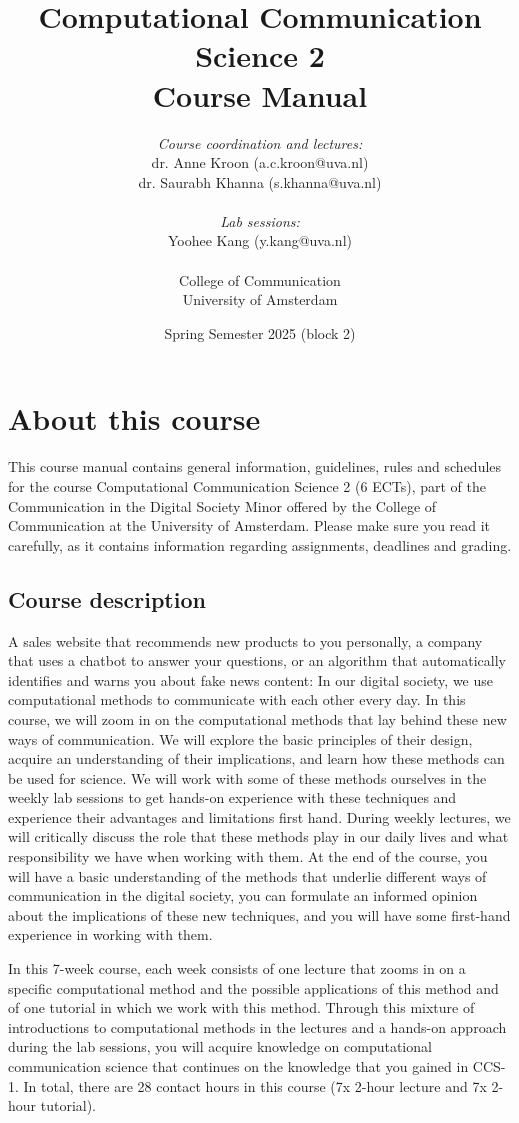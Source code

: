 \documentclass[a4paper,10pt]{report}
\title{Computational Communication Science 2\\ Course Manual}
\author{\emph{Course coordination and lectures:}\\ dr. Anne Kroon (a.c.kroon@uva.nl)\\dr. Saurabh Khanna (s.khanna@uva.nl) \\ \\ \emph{Lab sessions:} \\Yoohee Kang (y.kang@uva.nl) \\~\\College of Communication\\University of Amsterdam}
\date{Spring Semester 2025 (block 2)}
\begin{document}
	\maketitle
	
	\tableofcontents

	
	\chapter{About this course}
	
	This course manual contains general information, guidelines, rules and schedules for the course Computational Communication Science 2 (6 ECTs), part of the Communication in the Digital Society Minor offered by the College of Communication at the University of Amsterdam. Please make sure you read it carefully, as it  contains information regarding assignments, deadlines and grading.
	
	\section{Course description}
	
	A sales website that recommends new products to you personally, a company that uses a chatbot to answer your questions, or an algorithm that automatically identifies and warns you about fake news content: In our digital society, we use computational methods to communicate with each other every day. In this course, we will zoom in on the computational methods that lay behind these new ways of communication. We will explore the basic principles of their design, acquire an understanding of their implications, and learn how these methods can be used for science. We will work with some of these methods ourselves in the weekly lab sessions to get hands-on experience with these techniques and experience their advantages and limitations first hand. During weekly lectures, we will critically discuss the role that these methods play in our daily lives and what responsibility we have when working with them. At the end of the course, you will have a basic understanding of the methods that underlie different ways of communication in the digital society, you can formulate an informed opinion about the implications of these new techniques, and you will have some first-hand experience in working with them.
	
	In this 7-week course, each week consists of one lecture that zooms in on a specific computational method and the possible applications of this method and of one tutorial in which we work with this method. Through this mixture of introductions to computational methods in the lectures and a hands-on approach during the lab sessions, you will acquire knowledge on computational communication science that continues on the knowledge that you gained in CCS-1. In total, there are 28 contact hours in this course (7x 2-hour lecture and 7x 2-hour tutorial). 
	
\end{document}
